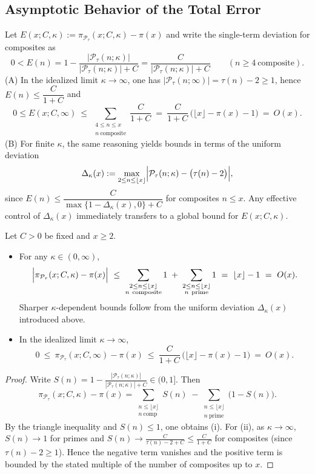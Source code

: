 \subsection{Asymptotic Behavior of the Total Error}
Let $E(x;C,\kappa):=\pi_{\mathcal P_\tau}(x; C, \kappa) - \pi(x)$ and write the single-term deviation for composites as
\[
0< E(n)=1-\frac{|\mathcal P_\tau(n;\kappa)|}{|\mathcal P_\tau(n;\kappa)|+C}
=\frac{C}{|\mathcal P_\tau(n;\kappa)|+C}\qquad(n\ge4\ \text{composite}).
\]
(A) In the idealized limit $\kappa\to\infty$, one has $|\mathcal P_\tau(n;\infty)|=\tau(n)-2\ge1$, hence $E(n)\le \dfrac{C}{1+C}$ and
\[
0\le E(x;C,\infty)\ \le\ \sum_{\substack{4\le n\le x\\ n\ \mathrm{composite}}}\frac{C}{1+C}
\ =\ \frac{C}{1+C}\,\bigl(\lfloor x\rfloor-\pi(x)-1\bigr)
\ =\ O(x).
\]
(B) For finite $\kappa$, the same reasoning yields bounds in terms of the uniform deviation
\[
\Delta_\kappa(x):=\max_{2\le n\le \lfloor x\rfloor}\Bigl|\mathcal P_\tau(n;\kappa)-\bigl(\tau(n)-2\bigr)\Bigr|,
\]
since $E(n)\le \dfrac{C}{\max\{1-\Delta_\kappa(x),0\}+C}$ for composites $n\le x$. Any effective control of $\Delta_\kappa(x)$ immediately transfers to a global bound for $E(x;C,\kappa)$.

\begin{proposition}
Let $C>0$ be fixed and $x\ge 2$.
\begin{itemize}
\item[(i)] For any $\kappa\in(0,\infty)$,
\[
\Bigl|\pi_{\mathcal P_\tau}(x;C,\kappa)-\pi(x)\Bigr|
\ \le\ \sum_{\substack{2\le n\le \lfloor x\rfloor\\ n\ \mathrm{composite}}} 1\;+\;\sum_{\substack{2\le n\le \lfloor x\rfloor\\ n\ \mathrm{prime}}} 1
\ =\ \lfloor x\rfloor-1
\ =\ O(x).
\]
Sharper $\kappa$-dependent bounds follow from the uniform deviation $\Delta_\kappa(x)$ introduced above.
\item[(ii)] In the idealized limit $\kappa\to\infty$,
\[
0\ \le\ \pi_{\mathcal P_\tau}(x;C,\infty)-\pi(x)
\ \le\ \frac{C}{1+C}\,\bigl(\lfloor x\rfloor-\pi(x)-1\bigr)
\ =\ O(x).
\]
\end{itemize}
\end{proposition}

\begin{proof}
Write $S(n)=1-\frac{|\mathcal P_\tau(n;\kappa)|}{|\mathcal P_\tau(n;\kappa)|+C}\in(0,1]$. Then
\[
\pi_{\mathcal P_\tau}(x;C,\kappa)-\pi(x)
=\sum_{\substack{n\le \lfloor x\rfloor\\ n\ \mathrm{comp}}}\!S(n)\;-\!\sum_{\substack{n\le \lfloor x\rfloor\\ n\ \mathrm{prime}}}\!\bigl(1-S(n)\bigr).
\]
By the triangle inequality and $S(n)\le 1$, one obtains (i). For (ii), as $\kappa\to\infty$, $S(n)\to 1$ for primes and $S(n)\to \frac{C}{\tau(n)-2+C}\le \frac{C}{1+C}$ for composites (since $\tau(n)-2\ge 1$). Hence the negative term vanishes and the positive term is bounded by the stated multiple of the number of composites up to $x$.
\end{proof}

